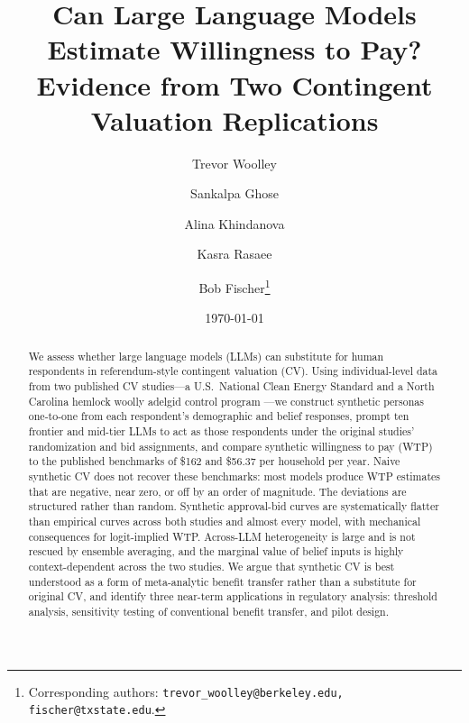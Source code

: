 \documentclass[12pt]{article}
\title{Can Large Language Models Estimate Willingness to Pay? \\ Evidence from Two Contingent Valuation Replications}
\date{\today}
\author[1]{Trevor Woolley}
\author[2, 5]{Sankalpa Ghose}
\author[3]{Alina Khindanova}
\author[4, 5]{Kasra Rasaee}
\author[6]{Bob Fischer\thanks{Corresponding authors: \texttt{trevor\_woolley@berkeley.edu, fischer@txstate.edu}.}}
\affil[1]{\textit{University of California, Berkeley}}
\affil[2]{\textit{National University of Singapore}}
\affil[3]{\textit{University of Texas at San Antonio}}
\affil[4]{\textit{Bloomberg}}
\affil[5]{\textit{Alethic Research}}
\affil[6]{\textit{Texas State University}}
\begin{document}

\maketitle


\footnotesize
\begin{abstract}
We assess whether large language models (LLMs) can substitute for human
respondents in referendum-style contingent valuation (CV). Using
individual-level data from two published CV studies---a U.S.\ National
Clean Energy Standard \parencite{Aldy2012} and a North Carolina hemlock
woolly adelgid control program \parencite{Giguere2020}---we construct
synthetic personas one-to-one from each respondent's demographic and
belief responses, prompt ten frontier and mid-tier LLMs to act as those
respondents under the original studies' randomization and bid
assignments, and compare synthetic willingness to pay (WTP) to the
published benchmarks of \$162 and \$56.37 per household per year. Naive
synthetic CV does not recover these benchmarks: most models produce WTP
estimates that are negative, near zero, or off by an order of magnitude.
The deviations are structured rather than random. Synthetic approval-bid
curves are systematically flatter than empirical curves across both
studies and almost every model, with mechanical consequences for
logit-implied WTP. Across-LLM heterogeneity is large and is not rescued
by ensemble averaging, and the marginal value of belief inputs is
highly context-dependent across the two studies. We argue that synthetic
CV is best understood as a form of meta-analytic benefit transfer rather
than a substitute for original CV, and identify three near-term
applications in regulatory analysis: threshold analysis, sensitivity
testing of conventional benefit transfer, and pilot design.
\end{abstract}

\newpage

%
\end{document}
